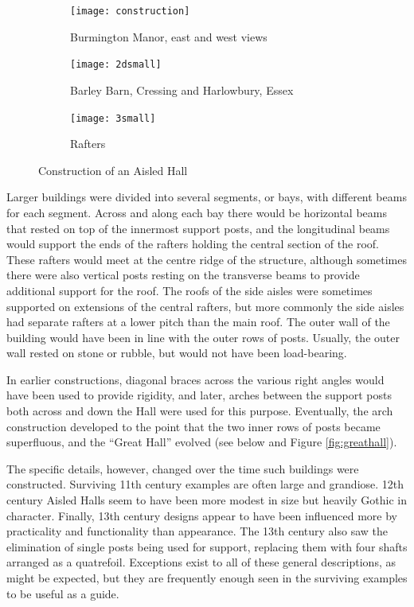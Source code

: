 \documentclass[letterpaper,11pt,titlepage]{article}
\begin{document}
{\begin{figure}
	\centering
	\begin{subfigure}[b]{0.65\textwidth}
		\texttt{[image: construction]}
		\caption{Burmington Manor, east and west views}
		\label{fig:burmington}
	\end{subfigure}
	\begin{subfigure}[b]{0.45\textwidth}
		\texttt{[image: 2dsmall]}
		\caption{Barley Barn, Cressing and Harlowbury, Essex}
		\label{fig:barn}
	\end{subfigure}
	\begin{subfigure}[b]{0.45\textwidth}
		\texttt{[image: 3small]}
		\caption{Rafters}
		\label{fig:rafters}
	\end{subfigure}
	\caption{Construction of an Aisled Hall}\label{fig:construction}
\end{figure}

Larger buildings were divided into several segments, or bays, with different beams for each segment. Across and along each bay there would be horizontal beams that rested on top of the innermost support posts, and the longitudinal beams would support the ends of the rafters holding the central section of the roof. These rafters would meet at the centre ridge of the structure, although sometimes there were also vertical posts resting on the transverse beams to provide additional support for the roof. The roofs of the side aisles were sometimes supported on extensions of the central rafters, but more commonly the side aisles had separate rafters at a lower pitch than the main roof. The outer wall of the building would have been in line with the outer rows of posts. Usually, the outer wall rested on stone or rubble, but would not have been load-bearing. 

In earlier constructions, diagonal braces across the various right angles would have been used to provide rigidity, and later, arches between the support posts both across and down the Hall were used for this purpose. Eventually, the arch construction developed to the point that the two inner rows of posts became superfluous, and the ``Great Hall'' evolved (see below and Figure \ref{fig:greathall}).

The specific details, however, changed over the time such buildings were constructed. Surviving 11th century examples are often large and grandiose. 12th century Aisled Halls seem to have been more modest in size but heavily Gothic in character. Finally, 13th century designs appear to have been influenced more by practicality and functionality than appearance. The 13th century also saw the elimination of single posts being used for support, replacing them with four shafts arranged as a quatrefoil. Exceptions exist to all of these general descriptions, as might be expected, but they are frequently enough seen in the surviving examples to be useful as a guide.

}
\end{document}
